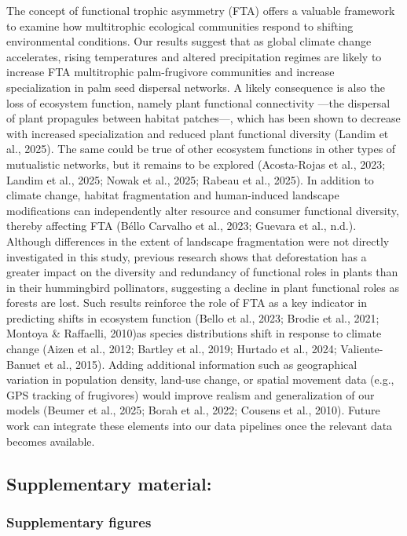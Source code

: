 \documentclass[
]{agujournal2019}
\begin{document}
The concept of functional trophic asymmetry (FTA) offers a valuable
framework to examine how multitrophic ecological communities respond to
shifting environmental conditions. Our results suggest that as global
climate change accelerates, rising temperatures and altered
precipitation regimes are likely to increase FTA multitrophic
palm-frugivore communities and increase specialization in palm seed
dispersal networks. A likely consequence is also the loss of ecosystem
function, namely plant functional connectivity ---the dispersal of plant
propagules between habitat patches---, which has been shown to decrease
with increased specialization and reduced plant functional diversity
(Landim et al., 2025). The same could be true of other ecosystem
functions in other types of mutualistic networks, but it remains to be
explored (Acosta-Rojas et al., 2023; Landim et al., 2025; Nowak et al.,
2025; Rabeau et al., 2025). In addition to climate change, habitat
fragmentation and human-induced landscape modifications can
independently alter resource and consumer functional diversity, thereby
affecting FTA (Béllo Carvalho et al., 2023; Guevara et al., n.d.).
Although differences in the extent of landscape fragmentation were not
directly investigated in this study, previous research shows that
deforestation has a greater impact on the diversity and redundancy of
functional roles in plants than in their hummingbird pollinators,
suggesting a decline in plant functional roles as forests are lost. Such
results reinforce the role of FTA as a key indicator in predicting
shifts in ecosystem function (Bello et al., 2023; Brodie et al., 2021;
Montoya \& Raffaelli, 2010)as species distributions shift in response to
climate change (Aizen et al., 2012; Bartley et al., 2019; Hurtado et
al., 2024; Valiente-Banuet et al., 2015). Adding additional information
such as geographical variation in population density, land-use change,
or spatial movement data (e.g., GPS tracking of frugivores) would
improve realism and generalization of our models (Beumer et al., 2025;
Borah et al., 2022; Cousens et al., 2010). Future work can integrate
these elements into our data pipelines once the relevant data becomes
available.

\subsection{Supplementary material:}\label{supplementary-material}

\subsubsection{Supplementary figures}\label{supplementary-figures}
\end{document}
